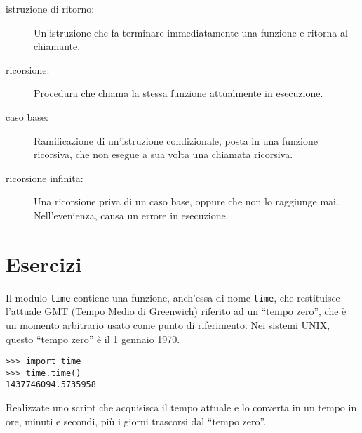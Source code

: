 \documentclass[10pt]{book}
\begin{document}
\begin{description}
\item[istruzione di ritorno:] Un'istruzione che fa terminare immediatamente una funzione e ritorna al chiamante.

\item[ricorsione:]  Procedura che chiama la stessa funzione attualmente in esecuzione.

\item[caso base:]  Ramificazione di un'istruzione condizionale, posta in una funzione ricorsiva, che non esegue a sua volta una chiamata ricorsiva.

\item[ricorsione infinita:]  Una ricorsione priva di un caso base, oppure che non lo raggiunge mai. Nell'evenienza, causa un errore in esecuzione.

\end{description}

\section{Esercizi}

\begin{exercise}

Il modulo {\tt time} contiene una funzione, anch'essa di nome {\tt time}, che restituisce l'attuale GMT (Tempo Medio di Greenwich) riferito ad un ``tempo zero'', che è un momento arbitrario usato come punto di riferimento. Nei sistemi UNIX, questo ``tempo zero'' è il 1 gennaio 1970.

\begin{verbatim}
>>> import time
>>> time.time()
1437746094.5735958
\end{verbatim}

Realizzate uno script che acquisisca il tempo attuale e lo converta in un tempo in ore, minuti e secondi, più i giorni trascorsi dal ``tempo zero''.

\end{exercise}
\end{document}
